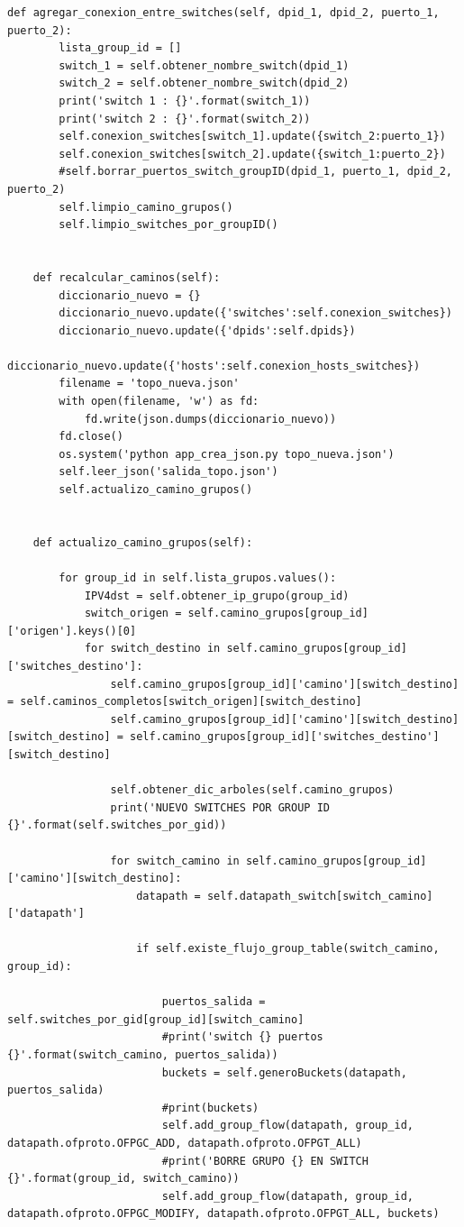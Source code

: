 \documentclass[12pt,a4paper,oneside]{book}
\begin{document}
\begin{lstlisting}[style=codigobase,  label = cod_correrP, caption= controlador.py]
    def agregar_conexion_entre_switches(self, dpid_1, dpid_2, puerto_1, puerto_2):
        lista_group_id = []
        switch_1 = self.obtener_nombre_switch(dpid_1)
        switch_2 = self.obtener_nombre_switch(dpid_2)
        print('switch 1 : {}'.format(switch_1))
        print('switch 2 : {}'.format(switch_2))
        self.conexion_switches[switch_1].update({switch_2:puerto_1})
        self.conexion_switches[switch_2].update({switch_1:puerto_2})
        #self.borrar_puertos_switch_groupID(dpid_1, puerto_1, dpid_2, puerto_2)
        self.limpio_camino_grupos()
        self.limpio_switches_por_groupID()


    def recalcular_caminos(self):
        diccionario_nuevo = {}
        diccionario_nuevo.update({'switches':self.conexion_switches})
        diccionario_nuevo.update({'dpids':self.dpids})
        diccionario_nuevo.update({'hosts':self.conexion_hosts_switches})
        filename = 'topo_nueva.json'
        with open(filename, 'w') as fd:
    	    fd.write(json.dumps(diccionario_nuevo))
        fd.close()
        os.system('python app_crea_json.py topo_nueva.json')
        self.leer_json('salida_topo.json')
        self.actualizo_camino_grupos()


    def actualizo_camino_grupos(self):

        for group_id in self.lista_grupos.values():
            IPV4dst = self.obtener_ip_grupo(group_id)
            switch_origen = self.camino_grupos[group_id]['origen'].keys()[0]
            for switch_destino in self.camino_grupos[group_id]['switches_destino']:
                self.camino_grupos[group_id]['camino'][switch_destino] = self.caminos_completos[switch_origen][switch_destino]
                self.camino_grupos[group_id]['camino'][switch_destino][switch_destino] = self.camino_grupos[group_id]['switches_destino'][switch_destino]

                self.obtener_dic_arboles(self.camino_grupos)
                print('NUEVO SWITCHES POR GROUP ID {}'.format(self.switches_por_gid))

                for switch_camino in self.camino_grupos[group_id]['camino'][switch_destino]:
                    datapath = self.datapath_switch[switch_camino]['datapath']

                    if self.existe_flujo_group_table(switch_camino, group_id):

                        puertos_salida = self.switches_por_gid[group_id][switch_camino]
                        #print('switch {} puertos {}'.format(switch_camino, puertos_salida))
                        buckets = self.generoBuckets(datapath, puertos_salida)
                        #print(buckets)
                        self.add_group_flow(datapath, group_id, datapath.ofproto.OFPGC_ADD, datapath.ofproto.OFPGT_ALL)
                        #print('BORRE GRUPO {} EN SWITCH {}'.format(group_id, switch_camino))
                        self.add_group_flow(datapath, group_id, datapath.ofproto.OFPGC_MODIFY, datapath.ofproto.OFPGT_ALL, buckets)


\end{lstlisting}
\end{document}

